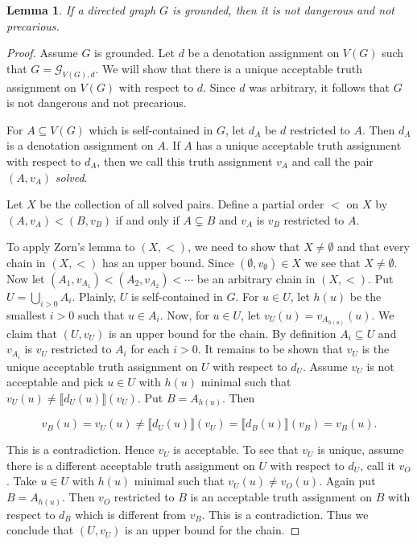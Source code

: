 \documentclass[12pt]{kluwer}
\newtheorem{lem}[thm]{Lemma}
\theoremstyle{remark}
\newcommand{\fancy}[1]{\mathcal{#1}}
\def\G{\fancy{G}}
\begin{document}
\begin{lem}\label{GroundedNotDangerous}
If a directed graph $G$ is grounded, then it is not dangerous and not precarious.
\end{lem}
\begin{proof}
Assume $G$ is grounded.  Let $d$ be a denotation assignment on $V(G)$ such that $G = \G_{V(G), d}$. We will show that there is a unique acceptable truth assignment on $V(G)$ with respect to $d$.  Since $d$ was arbitrary, it follows that $G$ is not dangerous and not precarious.\newline

For $A \subseteq V(G)$ which is self-contained in $G$, let $d_A$ be $d$ restricted to $A$.  Then $d_A$ is a denotation assignment on $A$.  If $A$ has a unique acceptable truth assignment with respect to $d_A$, then we call this truth assignment $v_A$ and call the pair $(A, v_A)$ \emph{solved}.\newline

Let $X$ be the collection of all solved pairs.  Define a partial order $<$ on $X$ by $(A, v_A) < (B, v_B)$ if and only if $A \subsetneq B$ and $v_A$ is $v_B$ restricted to $A$.\newline

To apply Zorn's lemma to $(X, <)$, we need to show that $X \neq \emptyset$ and that every chain in  $(X, <)$ has an upper bound. Since $(\emptyset, v_\emptyset) \in X$ we see that $X \neq \emptyset$.  Now let $(A_1, v_{A_1}) < (A_2, v_{A_2}) < \cdots$ be an arbitrary chain in $(X, <)$.  Put $U = \bigcup_{i > 0} A_i$. Plainly, $U$ is self-contained in $G$. For $u \in U$, let $h(u)$ be the smallest $i > 0$ such that $u \in A_i$.  Now, for $u \in U$, let $v_U(u) = v_{A_{h(u)}}(u)$.  We claim that $(U, v_U)$ is an upper bound for the chain.  By definition $A_i \subseteq U$ and $v_{A_i}$ is $v_U$ restricted to $A_i$ for each $i > 0$.  It remains to be shown that $v_U$ is the unique acceptable truth assignment on $U$ with respect to $d_U$.  Assume $v_U$ is not acceptable and pick $u \in U$ with $h(u)$ minimal such that $v_U(u) \neq \llbracket d_U(u)\rrbracket(v_U)$.  Put $B = A_{h(u)}$. Then

\[v_B(u) = v_U(u) \neq \llbracket d_U(u)\rrbracket(v_U) = \llbracket d_B(u)\rrbracket(v_B) = v_B(u).\]

This is a contradiction.  Hence $v_U$ is acceptable.  To see that $v_U$ is unique, assume there is a different acceptable truth assignment on $U$ with respect to $d_U$, call it $v_O$.  Take $u \in U$ with $h(u)$ minimal such that $v_U(u) \neq v_O(u)$.  Again put $B = A_{h(u)}$.  Then $v_O$ restricted to $B$ is an acceptable truth assignment on $B$ with respect to $d_B$ which is different from $v_B$.  This is a contradiction.  Thus we conclude that $(U, v_U)$ is an upper bound for the chain.\newline


\end{proof}
\end{document}
